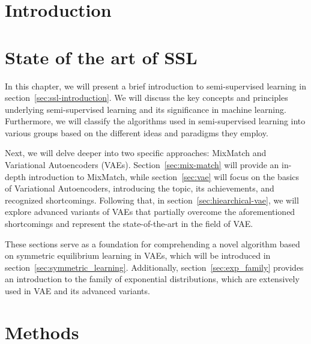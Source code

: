 \documentclass[twoside]{ctuthesis}
\theoremstyle{plain}
\theoremstyle{definition}
\theoremstyle{note}
\begin{document}
\maketitle


\chapter{Introduction}


\chapter{State of the art of SSL}
\label{motivation-theory}
In this chapter, we will present a brief introduction to semi-supervised learning in section~\ref{sec:ssl-introduction}.
We will discuss the key concepts and principles underlying semi-supervised learning and its significance in machine learning. 
Furthermore, we will classify the algorithms used in semi-supervised learning into various groups based on the different ideas 
and paradigms they employ.

Next, we will delve deeper into two specific approaches: MixMatch and Variational Autoencoders (VAEs). Section~\ref{sec:mix-match} 
will provide an in-depth introduction to MixMatch, while section~\ref{sec:vae} will focus on the basics of Variational Autoencoders, 
introducing the topic, its achievements, and recognized shortcomings. Following that, in section~\ref{sec:hiearchical-vae}, we will
explore advanced variants of VAEs that partially overcome the aforementioned shortcomings and represent the state-of-the-art in the field of VAE.

These sections serve as a foundation for comprehending a novel algorithm based on symmetric equilibrium learning in VAEs, 
which will be introduced in section~\ref{sec:symmetric_learning}. Additionally, section~\ref{sec:exp_family} provides an introduction 
to the family of exponential distributions, which are extensively used in VAE and its advanced variants.





\chapter{Methods}
\label{methods}



\end{document}

